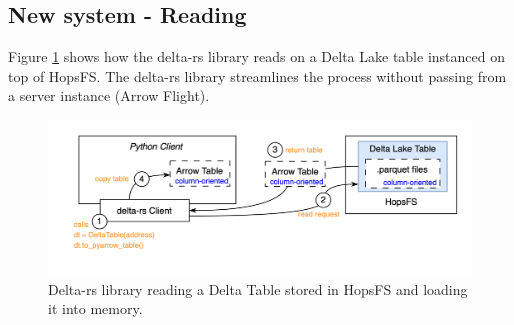 \subsection{New system - Reading}

Figure \ref{fig:delta_rs_reading} shows how the delta-rs library reads on a Delta Lake table instanced on top of \gls{HopsFS}. The delta-rs library streamlines the process without passing from a server instance (Arrow Flight).

\begin{figure}
    \begin{center}
      \includegraphics[width=\textwidth]{figures/2-background/delta-rs_reading.png}
    \end{center}
    \caption[Delta-rs library - Read process]{Delta-rs library reading a Delta Table stored in \gls{HopsFS} and loading it into memory.}
    \label{fig:delta_rs_reading}
\end{figure}